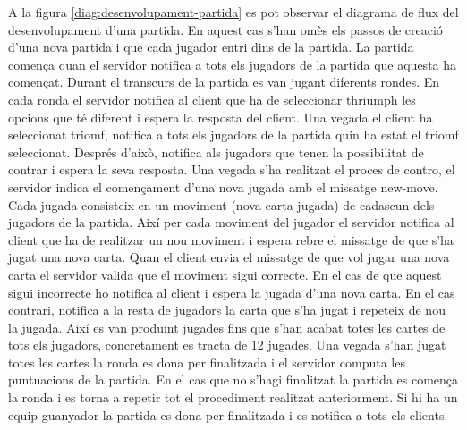 A la figura \ref{diag:desenvolupament-partida} es pot observar el diagrama de flux del desenvolupament d'una partida. En aquest cas s'han omès els passos de creació d'una nova partida i que cada jugador entri dins de la partida. La partida comença quan el servidor notifica a tots els jugadors de la partida que aquesta ha començat. Durant el transcurs de la partida es van jugant diferents rondes. En cada ronda el servidor notifica al client que ha de seleccionar thriumph les opcions que té diferent i espera la resposta del client. Una vegada el client ha seleccionat triomf, notifica a tots els jugadors de la partida quin ha estat el triomf seleccionat. Després d'això, notifica als jugadors que tenen la possibilitat de contrar i espera la seva resposta. Una vegada s'ha realitzat el proces de contro, el servidor indica el començament d'una nova jugada amb el missatge new-move. Cada jugada consisteix en un moviment (nova carta jugada) de cadascun dels jugadors de la partida. Així per cada moviment del jugador el servidor notifica al client que ha de realitzar un nou moviment i espera rebre el missatge de que s'ha jugat una nova carta. Quan el client envia el missatge de que vol jugar una nova carta el servidor valida que el moviment sigui correcte. En el cas de que aquest sigui incorrecte ho notifica al client i espera la jugada d'una nova carta. En el cas contrari, notifica a la resta de jugadors la carta que s'ha jugat i repeteix de nou la jugada. Així es van produint jugades fins que s'han acabat totes les cartes de tots els jugadors, concretament es tracta de 12 jugades. Una vegada s'han jugat totes les cartes la ronda es dona per finalitzada i el servidor computa les puntuacions de la partida. En el cas que no s'hagi finalitzat la partida es comença la ronda i es torna a repetir tot el procediment realitzat anteriorment. Si hi ha un equip guanyador la partida es dona per finalitzada i es notifica a tots els clients. 


